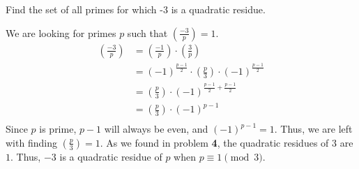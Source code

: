 \documentclass{article}
\newcommand{\legendre}[2]{\left(\frac{#1}{#2}\right)}
\begin{document}
\begin{problem}{}{}
    Find the set of all primes for which -3 is a quadratic residue.
\end{problem}
\begin{solution}{}{}
    We are looking for primes $p$ such that $\legendre{-3}{p}=1$.
    \begin{align*}
        \legendre{-3}{p} &=\legendre{-1}{p}\cdot\legendre{3}{p}\\
        &=(-1)^{\frac{p-1}{2}}\cdot\legendre{p}{3}\cdot(-1)^{\frac{p-1}{2}}\\
        &=\legendre{p}{3}\cdot(-1)^{\frac{p-1}{2}+\frac{p-1}{2}}\\
        &=\legendre{p}{3}\cdot(-1)^{p-1}\\
    \end{align*}
    Since $p$ is prime, $p-1$ will always be even, and $(-1)^{p-1}=1$. Thus, we are left with finding $\legendre{p}{3}=1$. As we found in problem \textbf{4}, the quadratic residues of $3$ are $1$. Thus, $-3$ is a quadratic residue of $p$ when $p\equiv1\pmod{3}$.
\end{solution}
\end{document}
